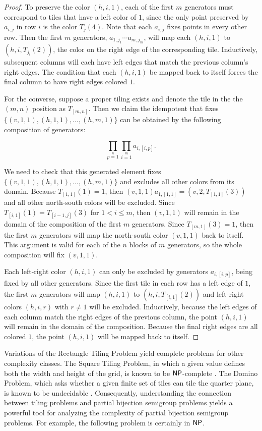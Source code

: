 \documentclass{amsart}
\newcommand{\NP}{\ensuremath\mathsf{NP}}
\theoremstyle{remark}
\numberwithin{equation}{section}
\begin{document}
\begin{proof}
To preserve the color $(h,i,1)$, each of the first $m$ generators must correspond to tiles that have a left color of $1$, since the only point preserved by $a_{i,j}$ in row $i$ is the color $T_j(4)$. Note that each $a_{i,j}$ fixes points in every other row. Then the first $m$ generators, $a_{1,j_1} \cdots a_{m,j_m}$, will map each $(h,i,1)$ to $(h,i,T_{j_i}(2))$, the color on the right edge of the corresponding tile. Inductively, subsequent columns will each have left edges that match the previous column's right edges. The condition that each $(h,i,1)$ be mapped back to itself forces the final column to have right edges colored $1$.

For the converse, suppose a proper tiling exists and denote the tile in the the $(m,n)$ position as $T_{[m,n]}$. Then we claim the idempotent that fixes $\{(v,1,1),(h,1,1),\dots,(h,m,1)\}$ can be obtained by the following composition of generators:

\[\prod \limits_{p = 1} \limits^n \prod \limits_{i=1} \limits^m a_{i,[i,p]}.\]

We need to check that this generated element fixes $\{(v,1,1),(h,1,1),\dots,(h,m,1)\}$ and excludes all other colors from its domain. Because $T_{[1,1]}(1)=1$, then $(v,1,1)a_{1,[1,1]} = (v,2,T_{[1,1]}(3))$ and all other north-south colors will be excluded. Since $T_{[i,1]}(1)=T_{[i-1,j]}(3)$ for $1<i\leq m$, then $(v,1,1)$ will remain in the domain of the composition of the first $m$ generators. Since $T_{[m,1]}(3)=1$, then the first $m$ generators will map the north-south color $(v,1,1)$ back to itself. This argument is valid for each of the $n$ blocks of $m$ generators, so the whole composition will fix $(v,1,1)$.

Each left-right color $(h,i,1)$ can only be excluded by generators $a_{i,[i,p]}$, being fixed by all other generators. Since the first tile in each row has a left edge of $1$, the first $m$ generators will map $(h,i,1)$ to $(h,i,T_{[i,1]}(2))$ and left-right colors $(h,i,r)$ with $r \neq 1$ will be excluded. Inductively, because the left edges of each column match the right edges of the previous column, the point $(h,i,1)$ will remain in the domain of the composition. Because the final right edges are all colored $1$, the point $(h,i,1)$ will be mapped back to itself.
\end{proof}

Variations of the Rectangle Tiling Problem yield complete problems for other complexity classes. The Square Tiling Problem, in which a given value defines both the width and height of the grid, is known to be $\NP$-complete \cite{CHL:DTG}. The Domino Problem, which asks whether a given finite set of tiles can tile the quarter plane, is known to be undecidable \cite{BE:UD}. Consequently, understanding the connection between tiling problems and partial bijection semigroup problems yields a powerful tool for analyzing the complexity of partial bijection semigroup problems. For example, the following problem is certainly in $\NP$.
\end{document}
